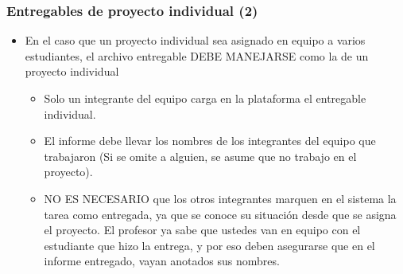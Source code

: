 \begin{frame}
\frametitle{Entregables de proyecto individual (2)}
    \begin{itemize}
    \item En el caso que un proyecto individual sea asignado en equipo a varios estudiantes, el archivo entregable DEBE MANEJARSE como la de un proyecto individual
    \begin{itemize}
        \item Solo un integrante del equipo carga en la plataforma el entregable individual.
        \item El informe debe llevar los nombres de los integrantes del equipo que trabajaron (Si se omite a alguien, se asume que no trabajo en el proyecto).
		\item NO ES NECESARIO que los otros integrantes marquen en el sistema la tarea como entregada, ya que se conoce su situación desde que se asigna el proyecto. El profesor ya sabe que ustedes van en equipo con el estudiante que hizo la entrega, y por eso deben asegurarse que en el informe entregado, vayan anotados sus nombres.
    \end{itemize}
    \end{itemize}
\end{frame}




